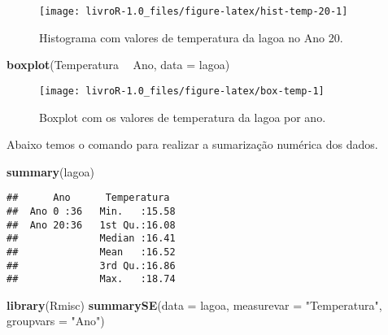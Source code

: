 \documentclass[14pt,titlepage, oneside, openany, a4paper]{book}
\newenvironment{Shaded}{\begin{snugshade}}{\end{snugshade}}
\newcommand{\DataTypeTok}[1]{\textcolor[rgb]{0.13,0.29,0.53}{#1}}
\newcommand{\KeywordTok}[1]{\textcolor[rgb]{0.13,0.29,0.53}{\textbf{#1}}}
\newcommand{\NormalTok}[1]{#1}
\newcommand{\OperatorTok}[1]{\textcolor[rgb]{0.81,0.36,0.00}{\textbf{#1}}}
\newcommand{\StringTok}[1]{\textcolor[rgb]{0.31,0.60,0.02}{#1}}
\begin{document}
\begin{figure}[H]

{\centering \texttt{[image: livroR-1.0\_files/figure-latex/hist-temp-20-1]} 

}

\caption{Histograma com valores de temperatura da lagoa no Ano 20.}\label{fig:hist-temp-20}
\end{figure}

\begin{Shaded}
\begin{Highlighting}[]
\KeywordTok{boxplot}\NormalTok{(Temperatura }\OperatorTok{~}\StringTok{ }\NormalTok{Ano, }\DataTypeTok{data =}\NormalTok{ lagoa)}
\end{Highlighting}
\end{Shaded}

\begin{figure}[H]

{\centering \texttt{[image: livroR-1.0\_files/figure-latex/box-temp-1]} 

}

\caption{Boxplot com os valores de temperatura da lagoa por ano.}\label{fig:box-temp}
\end{figure}

Abaixo temos o comando para realizar a sumarização numérica dos dados.

\begin{Shaded}
\begin{Highlighting}[]
\KeywordTok{summary}\NormalTok{(lagoa)}
\end{Highlighting}
\end{Shaded}

\begin{verbatim}
##      Ano      Temperatura   
##  Ano 0 :36   Min.   :15.58  
##  Ano 20:36   1st Qu.:16.08  
##              Median :16.41  
##              Mean   :16.52  
##              3rd Qu.:16.86  
##              Max.   :18.74
\end{verbatim}

\begin{Shaded}
\begin{Highlighting}[]
\KeywordTok{library}\NormalTok{(Rmisc)}
\KeywordTok{summarySE}\NormalTok{(}\DataTypeTok{data =}\NormalTok{ lagoa, }\DataTypeTok{measurevar =} \StringTok{"Temperatura"}\NormalTok{, }\DataTypeTok{groupvars =} \StringTok{"Ano"}\NormalTok{)}
\end{Highlighting}
\end{Shaded}
\end{document}
